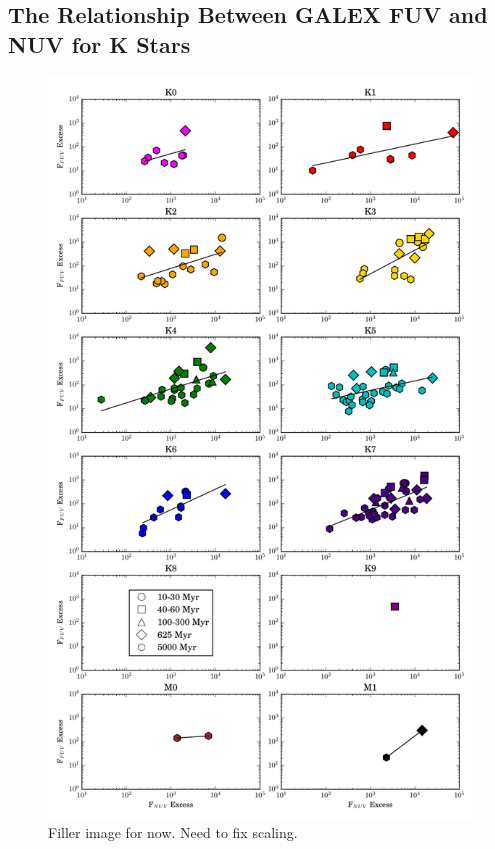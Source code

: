 \documentclass[twocolumn]{aastex62}
\begin{document}
\subsection{The Relationship Between GALEX FUV and NUV for K Stars}

\begin{figure}[h]
\centering
\includegraphics[height=\textheight]{nuv_vs_fuv_10_NO_J_Kspt.pdf}
\caption{Filler image for now. Need to fix scaling. \label{fig:nuv_vs_fuv}}
\end{figure}
\end{document}
